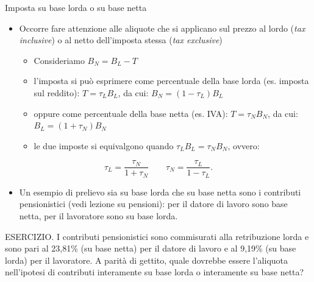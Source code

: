\documentclass[aspectratio=64,11pt]{beamer}
\begin{document}
\begin{frame}{Imposta su base lorda o su base netta}
\begin{itemize}
\item Occorre fare attenzione alle aliquote che si applicano sul prezzo al lordo
(\emph{tax inclusive}) o al netto dell'imposta stessa (\emph{tax exclusive})
\begin{itemize}
\item Consideriamo $B_N=B_L-T$
\item l'imposta si può esprimere come percentuale della base lorda (es. imposta sul reddito): $T=\tau_LB_L$, da cui: $B_N=(1-\tau_L)B_L$
\item oppure come percentuale della base netta (es. IVA): $T=\tau_NB_N$, da cui: $B_L=(1+\tau_N)B_N$
\item le due imposte si equivalgono quando $\tau_LB_L=\tau_NB_N$, ovvero:
\end{itemize}
\end{itemize}
\begin{equation*}
\tau_L =\frac{\tau_N}{1+\tau_N} \qquad\tau_N =\frac{\tau_L}{1-\tau_L}.
\end{equation*}
\begin{itemize}
\item Un esempio di prelievo sia su base lorda che su base netta sono i contributi pensionistici (vedi lezione su pensioni): per il datore di lavoro sono base netta, per il lavoratore sono su base lorda.
\end{itemize}
\begin{block}{}
\footnotesize
\alert{ESERCIZIO}. I contributi pensionistici sono commisurati alla retribuzione lorda e sono pari al 23,81\% (su base netta) per il datore di lavoro e al 9,19\% (su base lorda) per il lavoratore. A parità di gettito, quale dovrebbe essere l'aliquota nell'ipotesi di contributi interamente su base lorda o interamente su base netta?
\end{block}
\end{frame}
\end{document}
